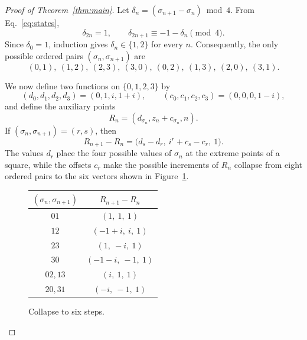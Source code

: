 \documentclass[12pt,reqno]{article}
\begin{document}
\begin{proof}[Proof of Theorem~\ref{thm:main}]
Let 
$\delta_n = (\sigma_{n+1}-\sigma_n) \bmod4$.  From Eq.~\eqref{eq:states},
\begin{equation}\label{eq:increments}
 \delta_{2n}=1,
 \qquad
 \delta_{2n+1}\equiv-1-\delta_n\pmod4.
\end{equation}
Since $\delta_0=1$, induction gives $\delta_n\in\{1,2\}$ for every $n$.
Consequently, the only possible ordered pairs $(\sigma_n, \sigma_{n+1})$ are
\begin{equation}
 (0,1),\ (1,2),\ (2,3),\ (3,0),\
 (0,2),\ (1,3),\ (2,0),\ (3,1).
 \label{pairs}
\end{equation}

We now define two functions on $\{0,1,2,3\}$ by
\[
 (d_0,d_1,d_2,d_3)=(0,1,i,1+i),
 \qquad
 (c_0,c_1,c_2,c_3)=(0,0,0,1-i),
\]
and define the auxiliary points
\[
 R_n=(d_{\sigma_n},z_n+c_{\sigma_n},n).
\]
If $(\sigma_n,\sigma_{n+1})=(r,s)$, then
\begin{equation}\label{eq:shadow-step}
 R_{n+1}-R_n
 =\bigl(d_s-d_r,\ i^r+c_s-c_r,\ 1\bigr).
\end{equation}
The values \(d_r\) place the four possible values of \(\sigma_n\) at the extreme points of a square, while the offsets \(c_r\) make the possible increments of \(R_n\) collapse from eight ordered pairs to the six vectors
 shown in Figure~\ref{fig:steps}.
\begin{figure}[htb]
\centering
\begin{minipage}[c]{.29\linewidth}
\centering
{}
\end{minipage}\hfill
\begin{minipage}[c]{.67\linewidth}
\centering
\begin{tabular}{c@{\qquad}c}
\toprule
$(\sigma_n, \sigma_{n+1})$ & $R_{n+1}-R_n$ \\
\midrule
$01$       & $(1,\ 1,\ 1)$ \\
$12$       & $(-1+i,\ i,\ 1)$ \\
$23$       & $(1,\ -i,\ 1)$ \\
$30$       & $(-1-i,\ -1,\ 1)$ \\
$02,13$    & $(i,\ 1,\ 1)$ \\
$20,31$    & $(-i,\ -1,\ 1)$ \\
\bottomrule
\end{tabular}
\end{minipage}
\caption{Collapse to six steps.}
\label{fig:steps}
\end{figure}


\end{proof}
\end{document}
